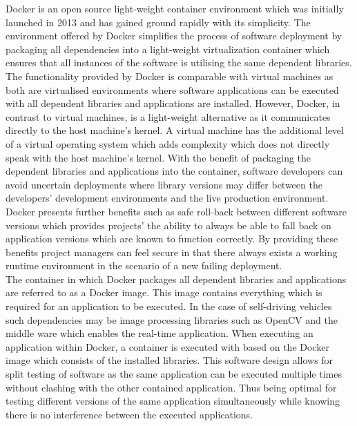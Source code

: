 Docker is an open source light-weight container environment which was initially launched in 2013 and has gained ground rapidly with its simplicity. The environment offered by Docker simplifies the process of software deployment by packaging all dependencies into a light-weight virtualization container which ensures that all instances of the software is utilising the same dependent libraries. The functionality provided by Docker is comparable with virtual machines as both are virtualised environments where software applications can be executed with all dependent libraries and applications are installed. However, Docker, in contrast to virtual machines, is a light-weight alternative as it communicates directly to the host machine's kernel. A virtual machine has the additional level of a virtual operating system which adds complexity which does not directly speak with the host machine's kernel. With the benefit of packaging the dependent libraries and applications into the container, software developers can avoid uncertain deployments where library versions may differ between the developers' development environments and the live production environment. Docker presents further benefits such as safe roll-back between different software versions which provides projects' the ability to always be able to fall back on application versions which are known to function correctly. By providing these benefits project managers can feel secure in that there always exists a working runtime environment in the scenario of a new failing deployment.\\

The container in which Docker packages all dependent libraries and applications are referred to as a Docker image. This image contains everything which is required for an application to be executed. In the case of self-driving vehicles such dependencies may be image processing libraries such as OpenCV and the middle ware which enables the real-time application. When executing an application within Docker, a container is executed with based on the Docker image which consists of the installed libraries. This software design allows for split testing of software as the same application can be executed multiple times without clashing with the other contained application. Thus being optimal for testing different versions of the same application simultaneously while knowing there is no interference between the executed applications.

